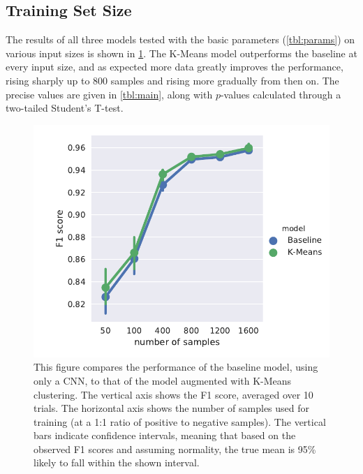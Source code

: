 \subsection{Training Set Size}
The results of all three models tested with the basic parameters
(\cref{tbl:params}) on various input sizes is shown in \cref{fig:result}. The
K-Means model outperforms the baseline at every input size, and as expected more
data greatly improves the performance, rising sharply up to 800 samples and
rising more gradually from then on. The precise values are given in
\cref{tbl:main}, along with $p$-values calculated through a two-tailed Student's
T-test.
\begin{figure}[tb]
  \centering
  \includegraphics[width=\textwidth]{figures/results/main/factorplot_f1_hue.pdf}
  \caption{This figure compares the performance of the baseline model, using
    only a CNN, to that of the model augmented with K-Means clustering. The
    vertical axis shows the F1 score, averaged over 10 trials. The horizontal
    axis shows the number of samples used for training (at a 1:1 ratio of
    positive to negative samples). The vertical bars indicate confidence
    intervals, meaning that based on the observed F1 scores and assuming
    normality, the true mean is 95\% likely to fall within the shown
    interval.\label{fig:result}}
\end{figure}
